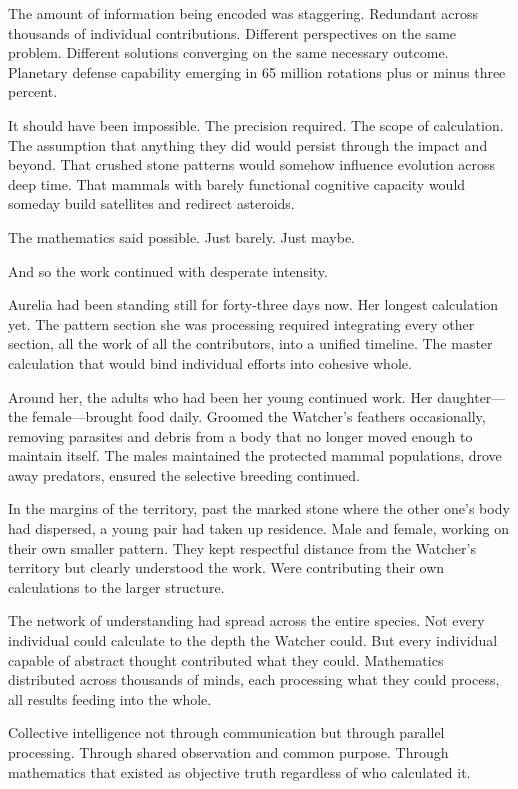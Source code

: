 The amount of information being encoded was staggering. Redundant across thousands of individual contributions. Different perspectives on the same problem. Different solutions converging on the same necessary outcome. Planetary defense capability emerging in 65 million rotations plus or minus three percent.

It should have been impossible. The precision required. The scope of calculation. The assumption that anything they did would persist through the impact and beyond. That crushed stone patterns would somehow influence evolution across deep time. That mammals with barely functional cognitive capacity would someday build satellites and redirect asteroids.

The mathematics said possible. Just barely. Just maybe.

And so the work continued with desperate intensity.

\scenebreak

Aurelia had been standing still for forty-three days now. Her longest calculation yet. The pattern section she was processing required integrating every other section, all the work of all the contributors, into a unified timeline. The master calculation that would bind individual efforts into cohesive whole.

Around her, the adults who had been her young continued work. Her daughter—the female—brought food daily. Groomed the Watcher's feathers occasionally, removing parasites and debris from a body that no longer moved enough to maintain itself. The males maintained the protected mammal populations, drove away predators, ensured the selective breeding continued.

In the margins of the territory, past the marked stone where the other one's body had dispersed, a young pair had taken up residence. Male and female, working on their own smaller pattern. They kept respectful distance from the Watcher's territory but clearly understood the work. Were contributing their own calculations to the larger structure.

The network of understanding had spread across the entire species. Not every individual could calculate to the depth the Watcher could. But every individual capable of abstract thought contributed what they could. Mathematics distributed across thousands of minds, each processing what they could process, all results feeding into the whole.

Collective intelligence not through communication but through parallel processing. Through shared observation and common purpose. Through mathematics that existed as objective truth regardless of who calculated it.

